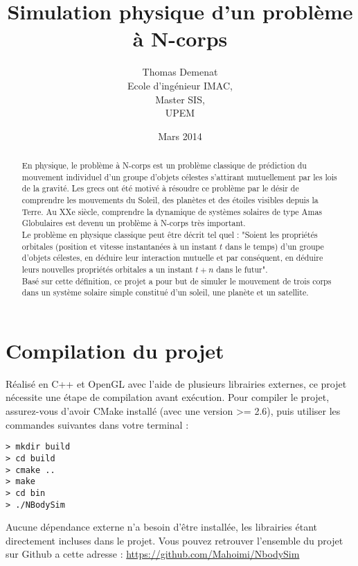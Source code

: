 \documentclass{article}
\begin{document}
\title{Simulation physique d'un problème à N-corps }
\author{Thomas Demenat\\
  Ecole d'ingénieur IMAC,\\
  Master SIS,\\
  UPEM}
  \date{Mars 2014}
\maketitle

\begin{abstract}
En physique, le problème à N-corps est un problème classique de prédiction du mouvement individuel d'un groupe d'objets célestes s'attirant mutuellement par les lois de la gravité. Les grecs ont été motivé à résoudre ce problème par le désir de comprendre les mouvements du Soleil, des planètes et des étoiles visibles depuis la Terre. Au XXe siècle, comprendre la dynamique de systèmes solaires de type Amas Globulaires est devenu un problème à N-corps très important.\\ 
Le problème en physique classique peut être décrit tel quel : "Soient les propriétés orbitales (position et vitesse instantanées à un instant $t$ dans le temps) d'un groupe d'objets célestes, en déduire leur interaction mutuelle et par conséquent, en déduire leurs nouvelles propriétés orbitales a un instant $t+n$ dans le futur".\\
Basé sur cette définition, ce projet a pour but de simuler le mouvement de trois corps dans un système solaire simple constitué d'un soleil, une planète et un satellite.
\end{abstract}

\section*{Compilation du projet}
Réalisé en C++ et OpenGL avec l'aide de plusieurs librairies externes, ce projet nécessite une étape de compilation avant exécution.
Pour compiler le projet, assurez-vous d'avoir CMake installé (avec une version >= 2.6), puis utiliser les commandes suivantes dans votre terminal :

\begin{verbatim}
> mkdir build
> cd build
> cmake ..
> make
> cd bin
> ./NBodySim
\end{verbatim}

Aucune dépendance externe n'a besoin d'être installée, les librairies étant directement incluses dans le projet.
Vous pouvez retrouver l'ensemble du projet sur Github a cette adresse : \url{https://github.com/Mahoimi/NbodySim}
\end{document}
